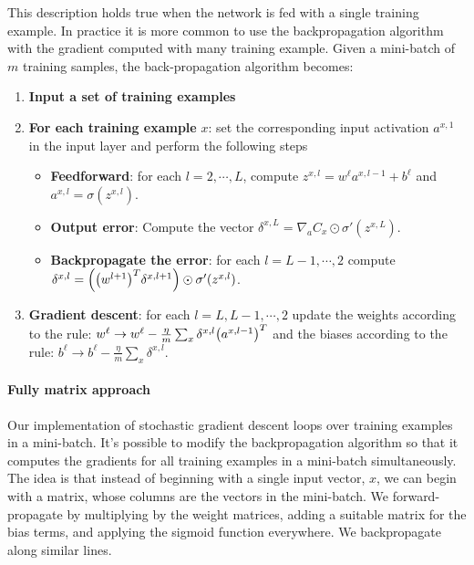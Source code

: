 \documentclass[12pt, letterpaper]{article}
\theoremstyle{definition}
\DeclarePairedDelimiter\autobracket{(}{)}
\newcommand{\br}[1]{\autobracket*{#1}}
\let\tb\textbf
\begin{document}
This description holds true when the network is fed with a single training example. In practice it is more common to use the backpropagation algorithm with the gradient computed with many training example. Given a mini-batch of $m$ training samples, the back-propagation algorithm becomes:
\begin{enumerate}
\item \tb{Input a set of training examples}
\item \tb{For each training example} $x$: set the corresponding input activation $a^{x,1}$ in the input layer and perform the following steps
\begin{itemize}
\item \tb{Feedforward}: for each $l=2,\cdots, L$, compute $z^{x,l} = w^\ell a^{x, l-1} +b^\ell$ and $a^{x,l} = \sigma(z^{x,l})$.
\item \tb{Output error}: Compute the vector $\delta^{x,L}= \nabla_a C_x \odot \sigma'(z^{x,L})$.
\item \tb{Backpropagate the error}: for each $l=L-1, \cdots, 2$ compute $\delta^{x,l}=\br{\br{w^{l+1}}^T\delta^{x,l+1}}\odot \sigma'(z^{x,l})$.
\end{itemize}
\item \tb{Gradient descent}: for each $l=L, L-1,\cdots,2$ update the weights according to the rule: $w^\ell \rightarrow w^\ell -\frac{\eta}{m} \sum_x \delta^{x,l}\br{a^{x,l-1}}^T$ and the biases according to the rule: $b^\ell \rightarrow b^\ell -\frac{\eta}{m} \sum_x \delta^{x,l}$.
\end{enumerate}

\paragraph{\tb{Fully matrix approach}} Our implementation of stochastic gradient descent loops over training examples in a mini-batch. It's possible to modify the backpropagation algorithm so that it computes the gradients for all training examples in a mini-batch simultaneously. The idea is that instead of beginning with a single input vector, $x$, we can begin with a matrix, whose columns are the vectors in the mini-batch. We forward-propagate by multiplying by the weight matrices, adding a suitable matrix for the bias terms, and applying the sigmoid function everywhere. We backpropagate along similar lines.
\end{document}
